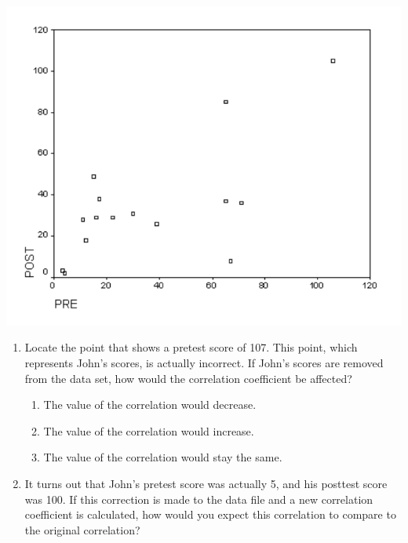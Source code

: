 \documentclass[11pt]{umnthesis}
\begin{document}
\begin{center}\includegraphics[width=0.6\linewidth]{figure/dr-jones-scatterplot} \end{center}

\begin{enumerate}
\def\labelenumi{\arabic{enumi}.}
\setcounter{enumi}{5}
\tightlist
\item
  Locate the point that shows a pretest score of 107. This point, which represents John's scores, is actually incorrect. If John's scores are removed from the data set, how would the correlation coefficient be affected?

  \begin{enumerate}
  \def\labelenumii{\alph{enumii}.}
  \tightlist
  \item
    The value of the correlation would decrease.
  \item
    The value of the correlation would increase.
  \item
    The value of the correlation would stay the same.
  \end{enumerate}
\item
  It turns out that John's pretest score was actually 5, and his posttest score was 100. If this correction is made to the data file and a new correlation coefficient is calculated, how would you expect this correlation to compare to the original correlation?


\end{enumerate}
\end{document}
